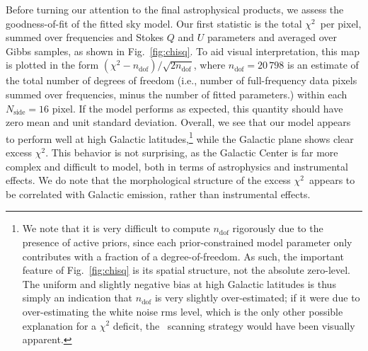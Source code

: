 \documentclass[twocolumn]{aa}
\def\WMAP{\textit{WMAP}}
\def\chisq{$\chi^2$}
\newcommand{\?}[1]{\textcolor{red}{{\bf [#1]}}}
\begin{document}

Before turning our attention to the final astrophysical products, we
assess the goodness-of-fit of the fitted sky model. Our first
statistic is the total \chisq\ per pixel, summed over frequencies and
Stokes $Q$ and $U$ parameters and averaged over Gibbs samples, as
shown in Fig.~\ref{fig:chisq}. To aid visual interpretation, this map
is plotted in the form
$(\chi^2-n_{\mathrm{dof}})/\sqrt{2n_{\mathrm{dof}}}$, where
$n_{\mathrm{dof}}=20\,798$ is an estimate of the total number of
degrees of freedom (i.e., number of full-frequency data pixels summed
over frequencies, minus the number of fitted parameters.) within each
$N_{\mathrm{side}}=16$ pixel. If the model performs as expected, this
quantity should have zero mean and unit standard deviation. Overall,
we see that our model appears to perform well at high Galactic
latitudes,\footnote{We note that it is very difficult to compute
  $n_{\mathrm{dof}}$ rigorously due to the presence of active priors,
  since each prior-constrained model parameter only contributes with a fraction of a
  degree-of-freedom. As such, the important feature of
  Fig.~\ref{fig:chisq} is its spatial structure, not the absolute
  zero-level. The uniform and slightly negative bias at high Galactic
  latitudes is thus simply an indication that $n_{\mathrm{dof}}$ is
  very slightly over-estimated; if it were due to over-estimating the
  white noise rms level, which is the only other possible explanation
  for a $\chi^2$ deficit, the \Planck\ scanning strategy would have
  been visually apparent.} while the Galactic plane shows clear excess
\chisq. This behavior is not surprising, as the Galactic Center is far
more complex and difficult to model, both in terms of astrophysics and
instrumental effects. We do note that the morphological structure of
the excess \chisq\ appears to be correlated with Galactic emission,
rather than instrumental effects.
\end{document}
